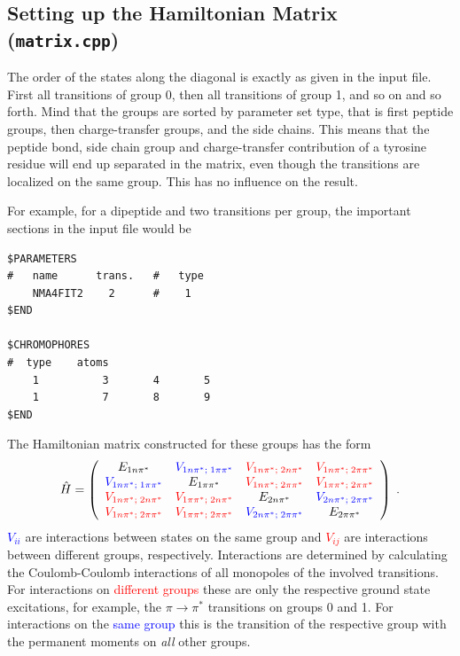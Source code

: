 \documentclass[11pt, letterpaper]{article}
\newcommand{\colred}  [1] {\textcolor{red}{#1}}
\newcommand{\colblue} [1] {\textcolor{blue}{#1}}
\begin{document}
\subsection{Setting up the Hamiltonian Matrix (\texttt{matrix.cpp})}

The order of the states along the diagonal is exactly as given in the input file. First all transitions of group 0, then all transitions of group 1, and so on and so forth. Mind that the groups are sorted by parameter set type, that is first peptide groups, then charge-transfer groups, and the side chains. This means that the peptide bond, side chain group and charge-transfer contribution of a tyrosine residue will end up separated in the matrix, even though the transitions are localized on the same group. This has no influence on the result.

For example, for a dipeptide and two transitions per group, the important sections in the input file would be
\begin{verbatim}
$PARAMETERS
#   name      trans.   #   type
    NMA4FIT2    2      #    1
$END

$CHROMOPHORES
#  type    atoms
    1          3       4       5
    1          7       8       9
$END
\end{verbatim}

The Hamiltonian matrix constructed for these groups has the form\cite{Bulheller:07:2020}
%
\begin{equation}
	\hat{H} =
	\left(
		\begin{array}{cccc}
			E_{1n\pi^*}                        &  \colblue{V_{1n\pi^*;\; 1\pi\pi^*}} &  \colred{V_{1n\pi^*;\; 2n\pi^*}}   & \colred{V_{1n\pi^*;\; 2\pi\pi^*}}   \\
			\colblue{V_{1n\pi^*;\; 1\pi\pi^*}} &  E_{1\pi\pi^*}                      &  \colred{V_{1n\pi^*;\; 2\pi\pi^*}} & \colred{V_{1\pi\pi^*;\; 2\pi\pi^*}} \\
			\colred{V_{1n\pi^*;\; 2n\pi^*}}    & \colred{V_{1\pi\pi^*;\; 2n\pi^*}}   &  E_{2n\pi^*}                       & \colblue{V_{2n\pi^*;\; 2\pi\pi^*}}  \\
			\colred{V_{1n\pi^*;\; 2\pi\pi^*}}  & \colred{V_{1\pi\pi^*;\; 2\pi\pi^*}} & \colblue{V_{2n\pi^*;\; 2\pi\pi^*}} & E_{2\pi\pi^*}                       \\
		\end{array}
	\right) \;.
	\label{Eqn:HamiltonianMatrix}
\end{equation}
%
\colblue{$V_{ii}$} are interactions between states on the same group and \colred{$V_{ij}$} are interactions between different groups, respectively. Interactions are determined by calculating the Coulomb-Coulomb interactions of all monopoles of the involved transitions. For interactions on \colred{different groups} these are only the respective ground state excitations, for example, the $\pi\rightarrow\pi^*$ transitions on groups 0 and 1. For interactions on the \colblue{same group} this is the transition of the respective group with the permanent moments on \emph{all} other groups.
\end{document}
